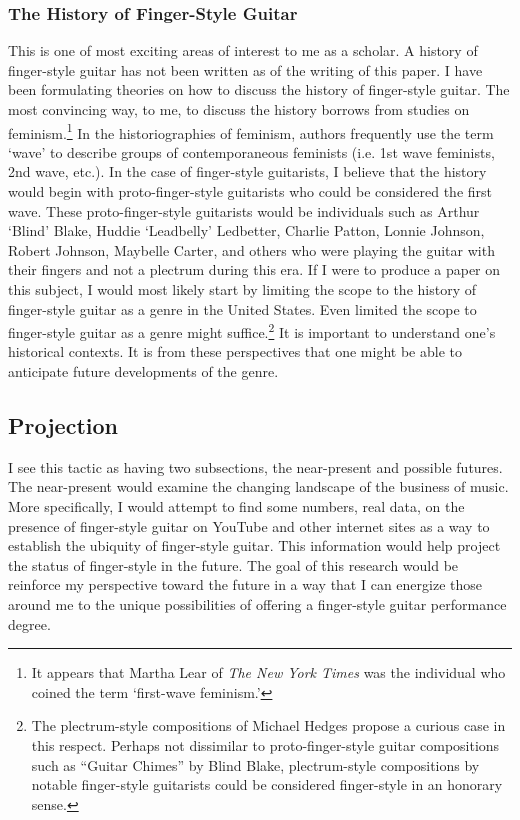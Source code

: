\documentclass[12pt]{article}
\begin{document}
\subsubsection{The History of Finger-Style Guitar}
\label{sec:history-finger-style}
This is one of most exciting areas of interest to me as a scholar. A
history of finger-style guitar has not been written as of the writing
of this paper. I have been formulating theories on how to discuss the
history of finger-style guitar. The most convincing way, to me, to
discuss the history borrows from studies on feminism.\footnote{It
  appears that Martha Lear of \emph{The New York Times} was the
  individual who coined the term `first-wave feminism.'} In the
historiographies of feminism, authors frequently use the term `wave'
to describe groups of contemporaneous feminists (i.e. 1st wave
feminists, 2nd wave, etc.). In the case of finger-style guitarists, I
believe that the history would begin with proto-finger-style
guitarists who could be considered the first wave. These
proto-finger-style guitarists would be individuals such as Arthur
`Blind' Blake, Huddie `Leadbelly' Ledbetter, Charlie Patton, Lonnie
Johnson, Robert Johnson, Maybelle Carter, and others who were playing
the guitar with their fingers and not a plectrum during this era. If I
were to produce a paper on this subject, I would most likely start by
limiting the scope to the history of finger-style guitar as a genre in
the United States. Even limited the scope to finger-style guitar as a
genre might suffice.\footnote{The plectrum-style compositions of
  Michael Hedges propose a curious case in this respect. Perhaps not
  dissimilar to proto-finger-style guitar compositions such as
  ``Guitar Chimes'' by Blind Blake, plectrum-style compositions by
  notable finger-style guitarists could be considered finger-style in
  an honorary sense.} It is important to understand one's historical
contexts. It is from these perspectives that one might be able to
anticipate future developments of the genre.

\subsection{Projection}
\label{sec:projection}
I see this tactic as having two subsections, the near-present and
possible futures. The near-present would examine the changing
landscape of the business of music. More specifically, I would attempt
to find some numbers, real data, on the presence of finger-style
guitar on YouTube and other internet sites as a way to establish the
ubiquity of finger-style guitar. This information would help project
the status of finger-style in the future.  The goal of this research
would be reinforce my perspective toward the future in a way that I
can energize those around me to the unique possibilities of offering a
finger-style guitar performance degree.
\end{document}
